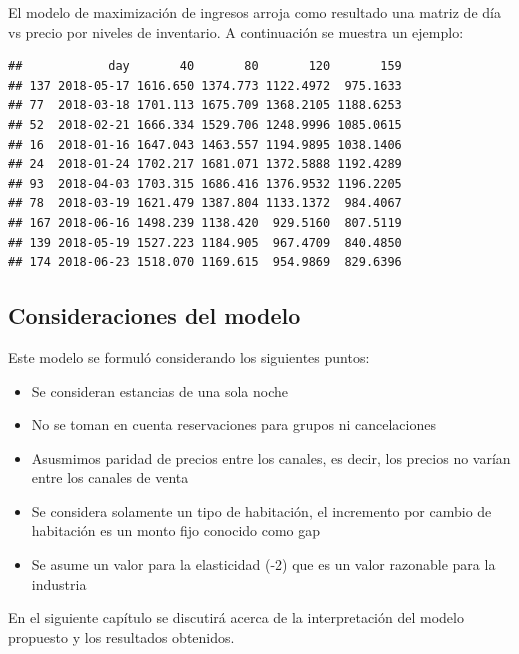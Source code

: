 El modelo de maximización de ingresos arroja como resultado una matriz de día vs precio por niveles de inventario. A continuación se muestra un ejemplo:

\begin{verbatim}
##            day       40       80       120       159
## 137 2018-05-17 1616.650 1374.773 1122.4972  975.1633
## 77  2018-03-18 1701.113 1675.709 1368.2105 1188.6253
## 52  2018-02-21 1666.334 1529.706 1248.9996 1085.0615
## 16  2018-01-16 1647.043 1463.557 1194.9895 1038.1406
## 24  2018-01-24 1702.217 1681.071 1372.5888 1192.4289
## 93  2018-04-03 1703.315 1686.416 1376.9532 1196.2205
## 78  2018-03-19 1621.479 1387.804 1133.1372  984.4067
## 167 2018-06-16 1498.239 1138.420  929.5160  807.5119
## 139 2018-05-19 1527.223 1184.905  967.4709  840.4850
## 174 2018-06-23 1518.070 1169.615  954.9869  829.6396
\end{verbatim}

\subsection*{Consideraciones del modelo}

Este modelo se formuló considerando los siguientes puntos:
\begin{itemize}[noitemsep]
  \item Se consideran estancias de una sola noche
  \item No se toman en cuenta reservaciones para grupos ni cancelaciones
  \item Asusmimos paridad de precios entre los canales, es decir, los precios no varían entre los canales de venta
  \item Se considera solamente un tipo de habitación, el incremento por cambio de habitación es un monto fijo conocido como gap
  \item Se asume un valor para la elasticidad (-2) que es un valor razonable para la industria
\end{itemize}

En el siguiente capítulo se discutirá acerca de la interpretación del modelo propuesto y los resultados obtenidos.
